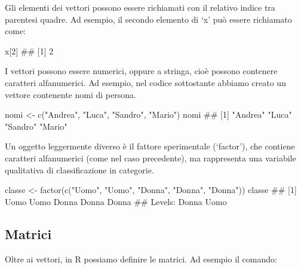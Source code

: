 \documentclass[a4paper,12pt,oneside]{book}
\newenvironment{Shaded}{}{}
\newcommand{\KeywordTok}[1]{#1}
\newcommand{\DecValTok}[1]{#1}
\newcommand{\StringTok}[1]{#1}
\newcommand{\CommentTok}[1]{#1}
\newcommand{\NormalTok}[1]{#1}
\begin{document}
Gli elementi dei vettori possono essere richiamati con il relativo indice tra parentesi quadre. Ad esempio, il secondo elemento di `x' può essere richiamato come:

\begin{Shaded}
\begin{Highlighting}[]
\NormalTok{x[}\DecValTok{2}\NormalTok{]}
\CommentTok{## [1] 2}
\end{Highlighting}
\end{Shaded}

I vettori possono essere numerici, oppure a stringa, cioè possono contenere caratteri alfanumerici. Ad esempio, nel codice sottostante abbiamo creato un vettore contenente nomi di persona.

\begin{Shaded}
\begin{Highlighting}[]
\NormalTok{nomi <-}\StringTok{ }\KeywordTok{c}\NormalTok{(}\StringTok{"Andrea"}\NormalTok{, }\StringTok{"Luca"}\NormalTok{, }\StringTok{"Sandro"}\NormalTok{, }\StringTok{"Mario"}\NormalTok{)}
\NormalTok{nomi}
\CommentTok{## [1] "Andrea" "Luca"   "Sandro" "Mario"}
\end{Highlighting}
\end{Shaded}

Un oggetto leggermente diverso è il fattore sperimentale (`factor'), che contiene caratteri alfanumerici (come nel caso precedente), ma rappresenta una variabile qualitativa di classificazione in categorie.

\begin{Shaded}
\begin{Highlighting}[]
\NormalTok{classe <-}\StringTok{ }\KeywordTok{factor}\NormalTok{(}\KeywordTok{c}\NormalTok{(}\StringTok{"Uomo"}\NormalTok{, }\StringTok{"Uomo"}\NormalTok{, }\StringTok{"Donna"}\NormalTok{, }\StringTok{"Donna"}\NormalTok{, }\StringTok{"Donna"}\NormalTok{))}
\NormalTok{classe}
\CommentTok{## [1] Uomo  Uomo  Donna Donna Donna}
\CommentTok{## Levels: Donna Uomo}
\end{Highlighting}
\end{Shaded}

\hypertarget{matrici}{%
\subsection*{Matrici}\label{matrici}}

Oltre ai vettori, in R possiamo definire le matrici. Ad esempio il comando:
\end{document}
